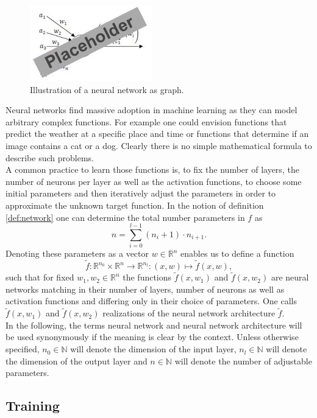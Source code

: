 \documentclass[11pt, a4paper]{article}
\newcommand{\N}{\mathbb{N}}
\newcommand{\R}{\mathbb{R}}
\begin{document}
\begin{figure}[!h]
\centering
\includegraphics{images/neuron.png}
\caption{Illustration of a neural network as graph.}
\label{fig:neuron}
\end{figure}  

Neural networks find massive adoption in machine learning as they can model arbitrary complex functions. For example one could envision functions that predict the weather at a specific place and time or functions that determine if an image contains a cat or a dog. Clearly there is no simple mathematical formula to describe such problems. \\

A common practice to learn those functions is, to fix the number of layers, the number of neurons per layer as well as the activation functions, to choose some initial parameters and then iteratively adjust the parameters in order to approximate the unknown target function. In the notion of definition \ref{def:network} one can determine the total number parameters in $f$ as
\[ n = \sum_{i=0}^{l-1} (n_i + 1) \cdot n_{i+1}. \]
Denoting these parameters as a vector $w \in \R^n$ enables us to define a function
\[ \tilde{f} : \R^{n_0} \times \R^n \to \R^{n_l} : (x,w) \mapsto \tilde{f}(x,w), \]
such that for fixed $w_1, w_2 \in \R^n$ the functions $\tilde{f}(x,w_1)$ and $\tilde{f}(x,w_2)$ are neural networks matching in their number of layers, number of neurons as well as activation functions and differing only in their choice of parameters. One calls $\tilde{f}(x,w_1)$ and $\tilde{f}(x,w_2)$ realizations of the neural network architecture $\tilde{f}$. \\

In the following, the terms neural network and neural network architecture will be used synonymously if the meaning is clear by the context. Unless otherwise specified, $n_0 \in \N$ will denote the dimension of the input layer, $n_l \in \N$ will denote the dimension of the output layer and $n \in \N$ will denote the number of adjustable parameters.

\subsection{Training}\label{sec:Training}
\end{document}

